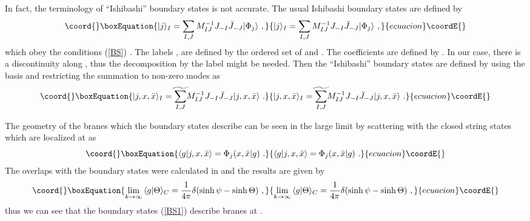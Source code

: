 \documentclass[a4paper,12pt]{article}
\providecommand{\ket}[1]{{|#1\rangle}{}}
\providecommand{\bra}[1]{{\langle#1|}}
\begin{document}
In fact, the terminology of ``Ishibashi'' boundary states is not accurate. 
The usual Ishibashi boundary states are defined by 
\begin{equation}\coord{}\boxEquation{
 \ket{j}_I = \sum_{I,J} M_{IJ}^{-1} J_{-I} \bar{J}_{-J} \ket{\Phi_j} ~,
}{
 \ket{j}_I = \sum_{I,J} M_{IJ}^{-1} J_{-I} \bar{J}_{-J} \ket{\Phi_j} ~,
}{ecuacion}\coordE{}\end{equation}
which obey the conditions (\ref{BS}) \cite{ishibashi,RR}. 
The labels \coordHE{}, \coordHE{} are defined by the ordered 
set of \coordHE{}  \coordHE{} 
and \coordHE{}. 
The coefficients \coordHE{} are defined by 
\myHighlight{$M_{IJ} = \bra{\Phi_j} J_I J_{-J} \ket{\Phi_j}$}\coordHE{}.
In our case, there is a discontinuity along \coordHE{}, thus the
decomposition by the label \coordHE{} might be needed.
Then the  ``Ishibashi'' boundary states are defined by using the basis
\myHighlight{$\ket{j,x,\bar{x}}$}\coordHE{} and restricting the summation to non-zero modes as
\begin{equation}\coord{}\boxEquation{
 \ket{j,x,\bar{x}}_I = 
 \widetilde{\sum_{I,J}}  M_{IJ}^{-1} J_{-I} \bar{J}_{-J} \ket{j,x,\bar{x}}~.
}{
 \ket{j,x,\bar{x}}_I = 
 \widetilde{\sum_{I,J}}  M_{IJ}^{-1} J_{-I} \bar{J}_{-J} \ket{j,x,\bar{x}}~.
}{ecuacion}\coordE{}\end{equation} 


The geometry of the branes which the boundary states describe 
can be seen in the large \coordHE{} limit by scattering with the
closed string states \myHighlight{$\ket{g}$}\coordHE{} which are localized at \coordHE{} \cite{MMS} as
\begin{equation}\coord{}\boxEquation{
 \bra{g} j,x, \bar{x} \rangle = \Phi_j (x,\bar{x} | g) ~.
}{
 \bra{g} j,x, \bar{x} \rangle = \Phi_j (x,\bar{x} | g) ~.
}{ecuacion}\coordE{}\end{equation}
The overlaps with the boundary states were calculated in \cite{LOP,PST}
and the results are given by
\begin{equation}\coord{}\boxEquation{
 \lim_{k \to \infty} \bra{g}\Theta \rangle _C = 
 \frac{1}{4\pi} \delta (\sinh \psi - \sinh \Theta ) ~,
}{
 \lim_{k \to \infty} \bra{g}\Theta \rangle _C = 
 \frac{1}{4\pi} \delta (\sinh \psi - \sinh \Theta ) ~,
}{ecuacion}\coordE{}\end{equation}
thus we can see that the boundary states (\ref{BS1}) describe \coordHE{}
branes at \myHighlight{$\psi = \Theta$}\coordHE{}.
\end{document}
